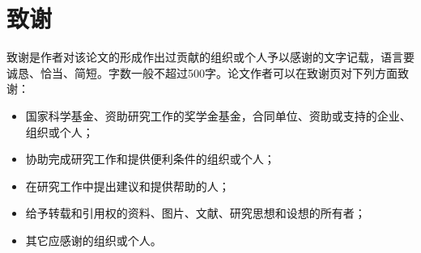 \chapter*{致\quad\quad 谢}

致谢是作者对该论文的形成作出过贡献的组织或个人予以感谢的文字记载，语言要诚恳、恰当、简短。字数一般不超过500字。论文作者可以在致谢页对下列方面致谢：

\begin{itemize}
\item 国家科学基金、资助研究工作的奖学金基金，合同单位、资助或支持的企业、组织或个人；
\item 协助完成研究工作和提供便利条件的组织或个人；
\item 在研究工作中提出建议和提供帮助的人；
\item 给予转载和引用权的资料、图片、文献、研究思想和设想的所有者；
\item 其它应感谢的组织或个人。
\end{itemize}